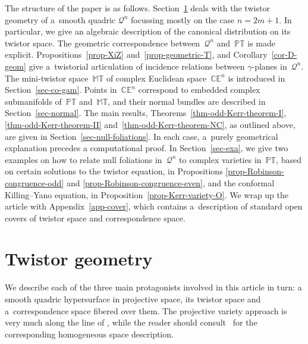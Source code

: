 \documentclass[10pt,a4paper]{amsart}
\numberwithin{equation}{section}
\newcommand{\mc} [1]{\mathcal{#1}}
\newcommand{\PT} {\mathbb{PT}}
\newcommand{\T} {\mathbb{T}}
\newcommand{\E} {\mathbb{E}}
\newcommand{\M} {\mathbb{M}}
\newcommand{\C} {\mathbb{C}}
\begin{document}
The structure of the paper is as follows. Section~\ref{sec-geo-bkgd} deals with the twistor geometry of a~smooth quadric $\mc{Q}^n$ focussing mostly on the case $n=2m+1$. In particular, we give an algebraic description of the canonical distribution on its twistor space. The geometric correspondence bet\-ween~$\mc{Q}^n$ and~$\PT$ is made explicit. Propositions~\ref{prop-XiZ} and~\ref{prop-geometric-T}, and Corollary~\ref{cor-D-geom} give a~twistorial articulation of incidence relations between $\gamma$-planes in~$\mc{Q}^n$. The mini-twistor space~$\M\T$ of complex Euclidean space~$\C \E^n$ is introduced in Section~\ref{sec-co-gam}. Points in~$\C \E^n$ correspond to embedded complex submanifolds of~$\PT$ and~$\M\T$, and their normal bundles are described in Section~\ref{sec-normal}. The main results, Theorems~\ref{thm-odd-Kerr-theorem-I}, \ref{thm-odd-Kerr-theorem-II} and~\ref{thm-odd-Kerr-theorem-NC}, as outlined above, are given in Section~\ref{sec-null-foliations}. In each case, a~purely geometrical explanation precedes a computational proof. In Section~\ref{sec-exa}, we give two examples on how to relate null foliations in~$\mc{Q}^n$ to complex varieties in~$\PT$, based on certain solutions to the twistor equation, in Propositions \ref{prop-Robinson-congruence-odd} and \ref{prop-Robinson-congruence-even}, and the conformal Killing--Yano equation, in Proposition~\ref{prop-Kerr-variety-O}. We wrap up the article with Appendix~\ref{app-cover}, which contains a~description of standard open covers of twistor space and correspondence space.

\section{Twistor geometry}\label{sec-geo-bkgd}
We describe each of the three main protagonists involved in this article in turn: a smooth quadric hypersurface in projective space, its twistor space and a~correspondence space f\/ibered over them. The projective variety approach is very much along the line of \cite{Hughston1983, Penrose1986}, while the reader should consult~\cite{Baston1989,vCap2009} for the corresponding homogeneous space description.
\end{document}
